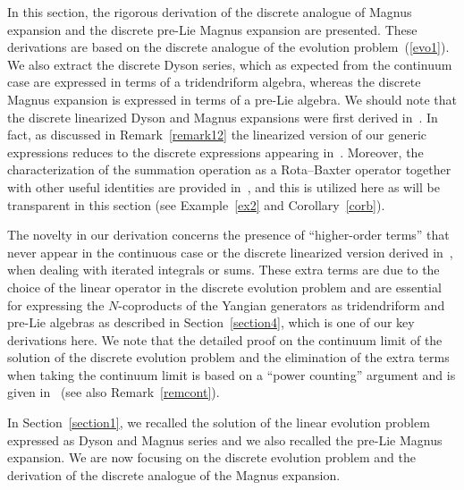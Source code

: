 \documentclass[pdftex]{sigma}
\numberwithin{equation}{section}
\theoremstyle{definition}
\begin{document}
In this section, the rigorous derivation of the discrete analogue of Magnus expansion and the discrete pre-Lie Magnus expansion are presented. These derivations are based on the discrete analogue of the evolution problem~(\ref{evo1}). We also extract the discrete Dyson series, which as expected from the continuum case are expressed in terms of a tridendriform {algebra}, whereas the discrete Magnus expansion is expressed in terms of a pre-Lie algebra. We should note that the discrete linearized Dyson and Magnus expansions were first derived in~\cite{EbraMan}. In fact, as discussed in Remark~\ref{remark12} the linearized version of our generic expressions reduces to the discrete expressions appearing in~\cite{EbraMan}. Moreover, the characterization of the summation operation as a Rota--Baxter operator together with other useful identities are provided in~\cite{EbraMan}, and this is utilized here as will be transparent in this section ({see Example~\ref{ex2} and Corollary~\ref{corb}}).

The novelty in our derivation concerns the presence of ``higher-order terms'' that never appear in the continuous case or the discrete linearized version derived in~\cite{EbraMan}, when dealing with iterated integrals or sums. These extra terms are due to the choice of the linear operator in the discrete evolution problem and are essential for expressing the $N$-coproducts of the Yangian generators as tridendriform and pre-Lie algebras as described in Section~\ref{section4}, which is one of our key derivations here.
We note that the detailed proof on the continuum
limit of the solution of the discrete evolution problem and the elimination of the extra terms when taking the continuum limit is based on a ``power counting'' argument and is given in~\cite{AvanDoikouSfetsos} (see also Remark~\ref{remcont}).

In Section~\ref{section1}, we recalled the solution of the linear evolution problem expressed as Dyson and Magnus series and we also recalled the pre-Lie Magnus expansion. We are now focusing on the discrete evolution problem and the derivation of the discrete analogue of the Magnus expansion.
\end{document}
